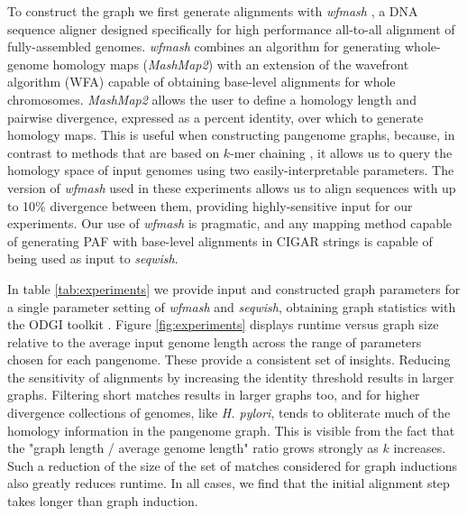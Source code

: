 \documentclass{bioinfo}
\theoremstyle{definition}
\begin{document}
To construct the graph we first generate alignments with \textit{wfmash} \citep{wfmash}, a DNA sequence aligner designed specifically for high performance all-to-all alignment of fully-assembled genomes.
\textit{wfmash} combines an algorithm for generating whole-genome homology maps (\textit{MashMap2}) \citep{Jain_2018} with an extension of the wavefront algorithm (WFA) \citep{Marco_Sola_2020} capable of obtaining base-level alignments for whole chromosomes.
\textit{MashMap2} allows the user to define a homology length and pairwise divergence, expressed as a percent identity, over which to generate homology maps.
This is useful when constructing pangenome graphs, because, in contrast to methods that are based on $k$-mer chaining \citep{harris2007lastz,Li_2018}, it allows us to query the homology space of input genomes using two easily-interpretable parameters.
The version of \textit{wfmash} used in these experiments allows us to align sequences with up to 10\% divergence between them, providing highly-sensitive input for our experiments.
Our use of \textit{wfmash} is pragmatic, and any mapping method capable of generating PAF with base-level alignments in CIGAR strings is capable of being used as input to \textit{seqwish}.


In table \ref{tab:experiments} we provide input and constructed graph parameters for a single parameter setting of \textit{wfmash} and \textit{seqwish}, obtaining graph statistics with the ODGI toolkit \citep{Guarracino2022}.
Figure \ref{fig:experiments} displays runtime versus graph size relative to the average input genome length across the range of parameters chosen for each pangenome.
These provide a consistent set of insights.
Reducing the sensitivity of alignments by increasing the identity threshold results in larger graphs.
Filtering short matches results in larger graphs too, and for higher divergence collections of genomes, like \textit{H. pylori}, tends to obliterate much of the homology information in the pangenome graph.
This is visible from the fact that the "graph length / average genome length" ratio grows strongly as $k$ increases.
Such a reduction of the size of the set of matches considered for graph inductions also greatly reduces runtime.
In all cases, we find that the initial alignment step takes longer than graph induction.
\end{document}
